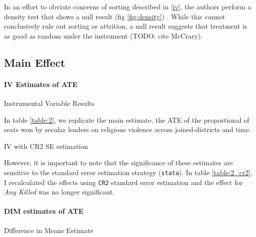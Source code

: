 \documentclass{scrartcl}
\begin{document}
In an effort to obviate concerns of sorting described in \ref{iv}, the authors perform a density test that shows a null result (fig \ref{fig:density}) \cite{mccrary_2008}.
While this cannot conclusively rule out sorting or attrition, a null result suggests that treatment is as good as random under the instrument (TODO: cite McCrary). 

\subsection{Main Effect}

\paragraph{IV Estimates of ATE} \label{ate:iv}

\begin{table}[ht]
  \begin{center}
    \scalebox{0.75}{
      
    }
    \caption{Instrumental Variable Results}
    \label{table:2}
  \end{center}
\end{table}

In table \ref{table:2}, we replicate the main estimate, the ATE of the proportional of seats won by secular leaders on religious violence across joined-districts and time. 

\begin{table}[ht]
  \begin{center}
    \scalebox{0.75}{
      
    }
    \caption{IV with CR2 SE estimation}
    \label{table:2_cr2}
  \end{center}
\end{table}

However, it is important to note that the significance of these estimates are sensitive to the standard error estimation strategy (\texttt{stata}).
In table \ref{table:2_cr2}, I recalculated the effects using \texttt{CR2} standard error estimation and the effect for \textit{Any Killed} was no longer significant.

\paragraph{DIM estimates of ATE}

\begin{table}[ht]
  \begin{center}
    \scalebox{0.75}{
      
    }
    \caption{Difference in Means Estimate}
    \label{table:3}
  \end{center}
\end{table}
\end{document}
